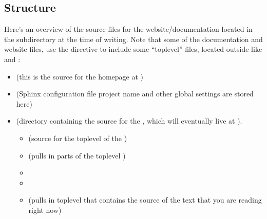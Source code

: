 \documentclass[letterpaper,10pt,english,openany,oneside]{sphinxmanual}
\begin{document}
\subsection{Structure}
\label{\detokenize{docs/guide-chapter-contributing:structure}}
\sphinxAtStartPar
Here’s an overview of the source files for the website/documentation
located in the  subdirectory at the time of writing.  Note
that some of the documentation and website files, use the
 directive to include some “top\sphinxhyphen{}level” files, located
outside  like  and :
\begin{itemize}
\item {} 
\sphinxAtStartPar
{} (this is the source for the homepage at
)

\item {} 
\sphinxAtStartPar
{} (Sphinx configuration file \sphinxhyphen{} project name and other
global settings are stored here)

\item {} 
\sphinxAtStartPar
{} (directory containing the source for the , which will eventually live at ).
\begin{itemize}
\item {} 
\sphinxAtStartPar
{} (source for the top\sphinxhyphen{}level of the )

\item {} 
\sphinxAtStartPar
{} (pulls in parts of the top\sphinxhyphen{}level )

\item {} 
\sphinxAtStartPar
{}

\item {} 
\sphinxAtStartPar
{}

\item {} 
\sphinxAtStartPar
{} (pulls in top\sphinxhyphen{}level
 that contains the source of the text that you are reading right now)


\end{itemize}
\end{itemize}
\end{document}
